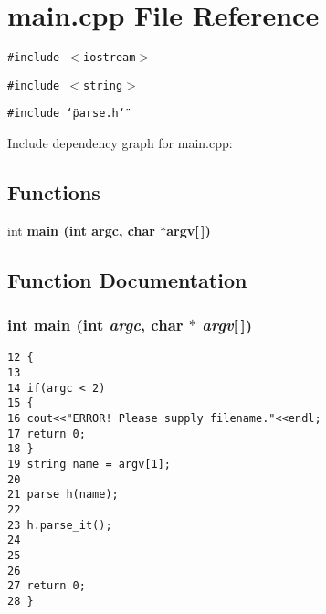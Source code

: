 \section{main.cpp File Reference}
\label{main_8cpp}
{\tt \#include $<$iostream$>$}\par
{\tt \#include $<$string$>$}\par
{\tt \#include \char`\"{}parse.h\char`\"{}}\par


Include dependency graph for main.cpp:\subsection*{Functions}
\begin{CompactItemize}
\item 
int \bf{main} (int argc, char $\ast$argv[$\,$])
\end{CompactItemize}


\subsection{Function Documentation}
\subsubsection{\setlength{\rightskip}{0pt plus 5cm}int main (int {\em argc}, char $\ast$ {\em argv}[$\,$])}\label{main_8cpp_0ddf1224851353fc92bfbff6f499fa97}




\begin{Code}\begin{verbatim}12 {
13 
14 if(argc < 2)
15 {
16 cout<<"ERROR! Please supply filename."<<endl;
17 return 0;
18 }
19 string name = argv[1];
20 
21 parse h(name);
22 
23 h.parse_it();
24 
25 
26 
27 return 0;
28 }
\end{verbatim}\end{Code}


